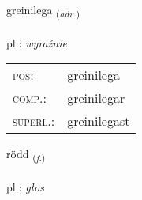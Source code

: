 \documentclass[frontgrid, backgrid]{flacards}\usepackage[]{graphicx}\usepackage[]{xcolor}
\begin{document}
\renewcommand{\flhead}{\vskip5pt \fboxsep=0pt {\small\bfseries\footnotesize Atviksorð | Adverb}}
\renewcommand{\fcfoot}{\vskip5pt \fboxsep=0pt \hspace{2pt}{\small\bfseries\footnotesize 2K}}

\renewcommand{\blhead}{\vskip5pt {\small\bfseries\footnotesize Atviksorð | Adverb }}
\renewcommand{\bcfoot}{\vskip5pt \hspace{2pt}{\small\bfseries\footnotesize 2K}}


{greinilega \small{\textsubscript{(\textit{adv.})}} \\[1ex] %
\textphonetic{[kreiːnɪlɛɣa]} \\
pl.: \emph{wyraźnie} \\  [2ex]
\renewcommand*{\arraystretch}{0.8}
\begin{tabular}{ll}
\textsc{pos}: & greinilega \\ 
\textsc{comp.}: & greinilegar \\ 
\textsc{superl.}: & greinilegast \\
\end{tabular}
}

\renewcommand{\flhead}{\vskip5pt \fboxsep=0pt {\small\bfseries\footnotesize Nafnorð | Noun}}
\renewcommand{\fcfoot}{\vskip5pt \fboxsep=0pt \hspace{2pt}{\small\bfseries\footnotesize 2K}}

\renewcommand{\blhead}{\vskip5pt {\small\bfseries\footnotesize Nafnorð | Noun }}
\renewcommand{\bcfoot}{\vskip5pt \hspace{2pt}{\small\bfseries\footnotesize 2K}}


{rödd \small{\textsubscript{(\textit{f.})}} \\[1ex] %
\textphonetic{[rœt]} \\
pl.: \emph{głos} \\  [2ex]
\renewcommand*{\arraystretch}{0.8}
}
\end{document}
